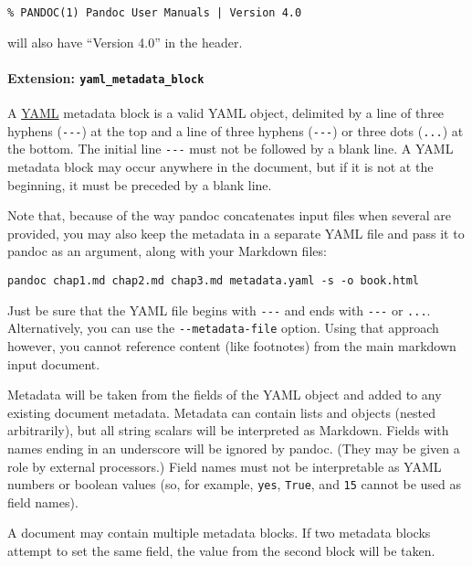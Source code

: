 \documentclass[
]{article}
\begin{document}
\begin{verbatim}
% PANDOC(1) Pandoc User Manuals | Version 4.0
\end{verbatim}

will also have ``Version 4.0'' in the header.

\paragraph{\texorpdfstring{Extension:
\texttt{yaml\_metadata\_block}}{Extension: yaml\_metadata\_block}}\label{extension-yaml_metadata_block}

A \href{https://yaml.org/spec/1.2/spec.html}{YAML} metadata block is a
valid YAML object, delimited by a line of three hyphens
(\texttt{-\/-\/-}) at the top and a line of three hyphens
(\texttt{-\/-\/-}) or three dots (\texttt{...}) at the bottom. The
initial line \texttt{-\/-\/-} must not be followed by a blank line. A
YAML metadata block may occur anywhere in the document, but if it is not
at the beginning, it must be preceded by a blank line.

Note that, because of the way pandoc concatenates input files when
several are provided, you may also keep the metadata in a separate YAML
file and pass it to pandoc as an argument, along with your Markdown
files:

\begin{verbatim}
pandoc chap1.md chap2.md chap3.md metadata.yaml -s -o book.html
\end{verbatim}

Just be sure that the YAML file begins with \texttt{-\/-\/-} and ends
with \texttt{-\/-\/-} or \texttt{...}. Alternatively, you can use the
\texttt{-\/-metadata-file} option. Using that approach however, you
cannot reference content (like footnotes) from the main markdown input
document.

Metadata will be taken from the fields of the YAML object and added to
any existing document metadata. Metadata can contain lists and objects
(nested arbitrarily), but all string scalars will be interpreted as
Markdown. Fields with names ending in an underscore will be ignored by
pandoc. (They may be given a role by external processors.) Field names
must not be interpretable as YAML numbers or boolean values (so, for
example, \texttt{yes}, \texttt{True}, and \texttt{15} cannot be used as
field names).

A document may contain multiple metadata blocks. If two metadata blocks
attempt to set the same field, the value from the second block will be
taken.
\end{document}
